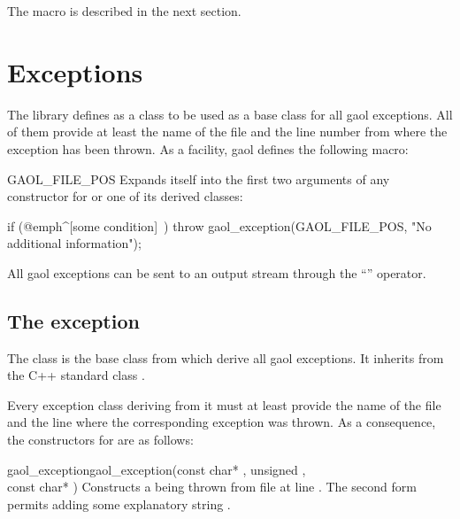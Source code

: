 \documentclass{manual}
\begin{document}
The  macro is described in the next section.

\section{Exceptions}\label{sec:exceptions}

The library defines  as a class to be used as a base
class for all gaol exceptions.
All of them provide at least the name of the file and the line number from
where the exception has been thrown. As a facility, gaol defines the following
macro:

\begin{defmacro}{GAOL\_FILE\_POS}
Expands itself into the first two arguments of any constructor for
 or one of its derived classes:

\begin{example}
if (@emph^[some condition]~) {
  throw gaol_exception(GAOL_FILE_POS,
                       "No additional information");
}
\end{example}
\end{defmacro}

All gaol exceptions can be sent to an output stream through the ``\code{<{}<}''
operator.

\subsection{The  exception}\label{sec:gaol_exception}
The  class is the base class from which derive all
gaol exceptions. It inherits from the C++ standard class .

Every exception class deriving from it must at least provide the name of
the file and the line where the corresponding exception was thrown. As a
consequence, the constructors for  are as follows:

\begin{defmethod}{gaol\_exception}{}{gaol\_exception}{(const char* , unsigned , \\\hbox{}\hfill const char* )}
Constructs a  being thrown from file  at
line . The second form permits adding some explanatory string .
\end{defmethod}
\end{document}
